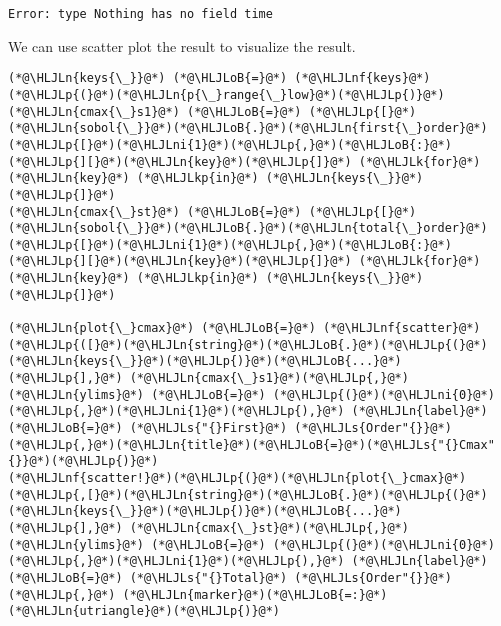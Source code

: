 \documentclass[12pt,a4paper]{article}
\newcommand{\HLJLk}[1]{\textcolor[RGB]{148,91,176}{\textbf{#1}}}
\newcommand{\HLJLkp}[1]{\textcolor[RGB]{148,91,176}{\textbf{#1}}}
\newcommand{\HLJLn}[1]{#1}
\newcommand{\HLJLnf}[1]{\textcolor[RGB]{66,102,213}{#1}}
\newcommand{\HLJLs}[1]{\textcolor[RGB]{201,61,57}{#1}}
\newcommand{\HLJLni}[1]{\textcolor[RGB]{59,151,46}{#1}}
\newcommand{\HLJLoB}[1]{\textcolor[RGB]{102,102,102}{\textbf{#1}}}
\newcommand{\HLJLp}[1]{#1}
\begin{document}
\begin{lstlisting}
Error: type Nothing has no field time
\end{lstlisting}


We can use scatter plot the result to visualize the result.


\begin{lstlisting}
(*@\HLJLn{keys{\_}}@*) (*@\HLJLoB{=}@*) (*@\HLJLnf{keys}@*)(*@\HLJLp{(}@*)(*@\HLJLn{p{\_}range{\_}low}@*)(*@\HLJLp{)}@*)
(*@\HLJLn{cmax{\_}s1}@*) (*@\HLJLoB{=}@*) (*@\HLJLp{[}@*)(*@\HLJLn{sobol{\_}}@*)(*@\HLJLoB{.}@*)(*@\HLJLn{first{\_}order}@*)(*@\HLJLp{[}@*)(*@\HLJLni{1}@*)(*@\HLJLp{,}@*)(*@\HLJLoB{:}@*)(*@\HLJLp{][}@*)(*@\HLJLn{key}@*)(*@\HLJLp{]}@*) (*@\HLJLk{for}@*) (*@\HLJLn{key}@*) (*@\HLJLkp{in}@*) (*@\HLJLn{keys{\_}}@*)(*@\HLJLp{]}@*)
(*@\HLJLn{cmax{\_}st}@*) (*@\HLJLoB{=}@*) (*@\HLJLp{[}@*)(*@\HLJLn{sobol{\_}}@*)(*@\HLJLoB{.}@*)(*@\HLJLn{total{\_}order}@*)(*@\HLJLp{[}@*)(*@\HLJLni{1}@*)(*@\HLJLp{,}@*)(*@\HLJLoB{:}@*)(*@\HLJLp{][}@*)(*@\HLJLn{key}@*)(*@\HLJLp{]}@*) (*@\HLJLk{for}@*) (*@\HLJLn{key}@*) (*@\HLJLkp{in}@*) (*@\HLJLn{keys{\_}}@*)(*@\HLJLp{]}@*)

(*@\HLJLn{plot{\_}cmax}@*) (*@\HLJLoB{=}@*) (*@\HLJLnf{scatter}@*)(*@\HLJLp{([}@*)(*@\HLJLn{string}@*)(*@\HLJLoB{.}@*)(*@\HLJLp{(}@*)(*@\HLJLn{keys{\_}}@*)(*@\HLJLp{)}@*)(*@\HLJLoB{...}@*)(*@\HLJLp{],}@*) (*@\HLJLn{cmax{\_}s1}@*)(*@\HLJLp{,}@*) (*@\HLJLn{ylims}@*) (*@\HLJLoB{=}@*) (*@\HLJLp{(}@*)(*@\HLJLni{0}@*)(*@\HLJLp{,}@*)(*@\HLJLni{1}@*)(*@\HLJLp{),}@*) (*@\HLJLn{label}@*) (*@\HLJLoB{=}@*) (*@\HLJLs{"{}First}@*) (*@\HLJLs{Order"{}}@*)(*@\HLJLp{,}@*)(*@\HLJLn{title}@*)(*@\HLJLoB{=}@*)(*@\HLJLs{"{}Cmax"{}}@*)(*@\HLJLp{)}@*)
(*@\HLJLnf{scatter!}@*)(*@\HLJLp{(}@*)(*@\HLJLn{plot{\_}cmax}@*)(*@\HLJLp{,[}@*)(*@\HLJLn{string}@*)(*@\HLJLoB{.}@*)(*@\HLJLp{(}@*)(*@\HLJLn{keys{\_}}@*)(*@\HLJLp{)}@*)(*@\HLJLoB{...}@*)(*@\HLJLp{],}@*) (*@\HLJLn{cmax{\_}st}@*)(*@\HLJLp{,}@*) (*@\HLJLn{ylims}@*) (*@\HLJLoB{=}@*) (*@\HLJLp{(}@*)(*@\HLJLni{0}@*)(*@\HLJLp{,}@*)(*@\HLJLni{1}@*)(*@\HLJLp{),}@*) (*@\HLJLn{label}@*) (*@\HLJLoB{=}@*) (*@\HLJLs{"{}Total}@*) (*@\HLJLs{Order"{}}@*)(*@\HLJLp{,}@*) (*@\HLJLn{marker}@*)(*@\HLJLoB{=:}@*)(*@\HLJLn{utriangle}@*)(*@\HLJLp{)}@*)


\end{lstlisting}
\end{document}

